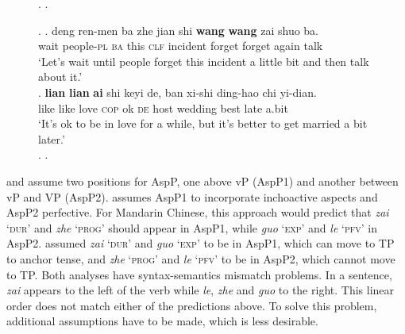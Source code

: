 \documentclass[
a4paper,
10pt,
oneside,
]{scrartcl}
\begin{document}
\begin{figure}
\ex.\label{tree:ramchand}
\scalebox{0.7}{
\begin{forest}
[initP (causing projection) [DP$_3$\\subject of `cause']
  [ [init]
    [procP (process projection)
      [DP$_2$\\subject of `process']
      [[proc]
        [resP (result projection)
        [DP$_1$\\subject of `result']
          [[res] [XP]
          ]
        ]
      ] ]
    ]
  ]
\end{forest} 
}
\z.

\begin{multicols}{2}
\ex.\label{ex:achi}
\ag. deng ren-men ba zhe jian shi \textbf{wang} \textbf{wang} zai shuo ba.\footnotemark\\
wait people-\textsc{pl} \textsc{ba} this \textsc{clf} incident forget forget again talk\\
 `Let's wait until people forget this incident a little bit and then talk about it.'\\
\bg. \textbf{lian} \textbf{lian} \textbf{ai} shi keyi de, ban xi-shi ding-hao chi yi-dian.\footnotemark\\
like like love \textsc{cop} ok \textsc{de} host wedding best late {a.bit}\\
`It's ok to be in love for a while, but it's better to get married a bit later.'\\
\z.
\z.

\end{multicols}
\vspace{-2\baselineskip}
\end{figure}


\citet{Travis1999-short, Travis2000-short} and \citet{Tsai2008} assume two positions for AspP, one
above vP (AspP1) and another between vP and VP (AspP2). \citet{Travis1999-short, Travis2000-short}
assumes AspP1 to incorporate inchoactive aspects and AspP2 perfective. For Mandarin Chinese, this approach would predict that \emph{zai} `\textsc{dur}' and \emph{zhe} `\textsc{prog}' should appear in AspP1, while \emph{guo} `\textsc{exp}' and \emph{le} `\textsc{pfv}' in AspP2. \citet{Tsai2008} assumed
\emph{zai} `\textsc{dur}' and \emph{guo} `\textsc{exp}' to be in AspP1, which can move to TP to anchor tense, and
\emph{zhe} `\textsc{prog}' and \emph{le} `\textsc{pfv}' to be in AspP2, which cannot move to TP. Both
analyses have syntax-semantics mismatch problems. In a sentence, \emph{zai} appears to the left of
the verb while \emph{le}, \emph{zhe} and \emph{guo} to the right. This linear order does not match either of the predictions above. To solve this problem, additional assumptions
have to be made, which is less desirable. 
\end{document}
